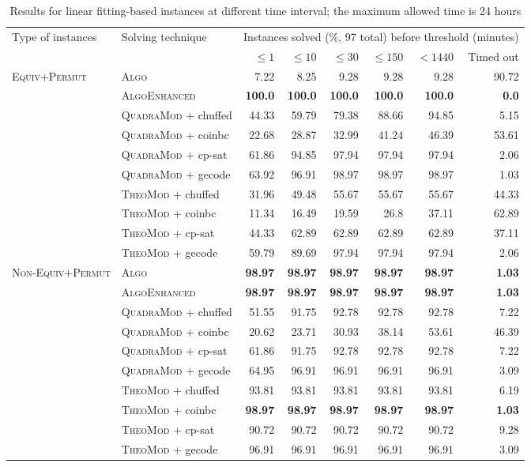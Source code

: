 \documentclass{book}
\begin{document}
\vspace{2cm}

\begin{table}[]\scriptsize\centering
\caption{Results for linear fitting-based instances at different time interval; the maximum allowed time is 24 hours}
\begin{tabular}{@{}ll rr rr rr@{}}\toprule Type of instances & Solving technique  & \multicolumn{6}{c}{Instances solved (\%, 97 total) before threshold (minutes)}\\\cmidrule(l){3-8}&  &  $\leq 1$ &  $\leq 10$ &  $\leq 30$ &  $\leq 150$ &  $ < 1440$ & Timed out\\
\midrule
\multirow{10}{*}{\textsc{Equiv+Permut}} & \textsc{Algo}   & 7.22 & 8.25 & 9.28 & 9.28 & 9.28 & 90.72 \\
& \textsc{AlgoEnhanced}   & \bf 100.0 & \bf 100.0 & \bf 100.0 & \bf 100.0 & \bf 100.0 &  \bf 0.0 \\
& \textsc{QuadraMod} + chuffed   & 44.33 & 59.79 & 79.38 & 88.66 & 94.85 & 5.15 \\
& \textsc{QuadraMod} + coinbc   & 22.68 & 28.87 & 32.99 & 41.24 & 46.39 & 53.61 \\
& \textsc{QuadraMod} + cp-sat   & 61.86 & 94.85 & 97.94 & 97.94 & 97.94 & 2.06 \\
& \textsc{QuadraMod} + gecode   & 63.92 & 96.91 & 98.97 & 98.97 & 98.97 & 1.03 \\
& \textsc{TheoMod} + chuffed   & 31.96 & 49.48 & 55.67 & 55.67 & 55.67 & 44.33 \\
& \textsc{TheoMod} + coinbc   & 11.34 & 16.49 & 19.59 & 26.8 & 37.11 & 62.89 \\
& \textsc{TheoMod} + cp-sat   & 44.33 & 62.89 & 62.89 & 62.89 & 62.89 & 37.11 \\
& \textsc{TheoMod} + gecode   & 59.79 & 89.69 & 97.94 & 97.94 & 97.94 & 2.06 \\
\midrule\multirow{10}{*}{\textsc{Non-Equiv+Permut}} & \textsc{Algo}   & \bf 98.97 & \bf 98.97 & \bf 98.97 & \bf 98.97 & \bf 98.97 &  \bf 1.03 \\
& \textsc{AlgoEnhanced}   & \bf 98.97 & \bf 98.97 & \bf 98.97 & \bf 98.97 & \bf 98.97 &  \bf 1.03 \\
& \textsc{QuadraMod} + chuffed   & 51.55 & 91.75 & 92.78 & 92.78 & 92.78 & 7.22 \\
& \textsc{QuadraMod} + coinbc   & 20.62 & 23.71 & 30.93 & 38.14 & 53.61 & 46.39 \\
& \textsc{QuadraMod} + cp-sat   & 61.86 & 91.75 & 92.78 & 92.78 & 92.78 & 7.22 \\
& \textsc{QuadraMod} + gecode   & 64.95 & 96.91 & 96.91 & 96.91 & 96.91 & 3.09 \\
& \textsc{TheoMod} + chuffed   & 93.81 & 93.81 & 93.81 & 93.81 & 93.81 & 6.19 \\
& \textsc{TheoMod} + coinbc   & \bf 98.97 & \bf 98.97 & \bf 98.97 & \bf 98.97 & \bf 98.97 &  \bf 1.03 \\
& \textsc{TheoMod} + cp-sat   & 90.72 & 90.72 & 90.72 & 90.72 & 90.72 & 9.28 \\
& \textsc{TheoMod} + gecode   & 96.91 & 96.91 & 96.91 & 96.91 & 96.91 & 3.09 \\
\bottomrule\end{tabular} 

\end{table} 



\newpage
\end{document}
